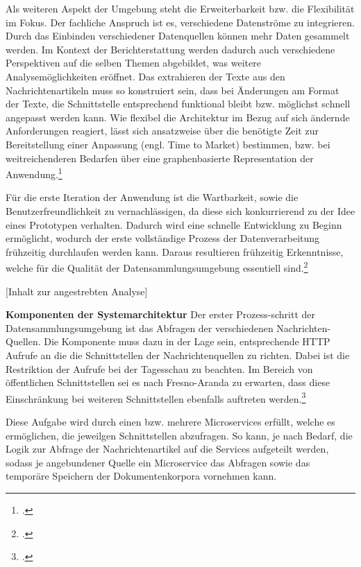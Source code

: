 Als weiteren Aspekt der Umgebung steht die Erweiterbarkeit bzw. die Flexibilität im Fokus. Der fachliche Anspruch ist es, verschiedene Datenströme zu integrieren. Durch das Einbinden verschiedener Datenquellen können mehr Daten gesammelt werden. Im Kontext der Berichterstattung werden dadurch auch verschiedene Perspektiven auf die selben Themen abgebildet, was weitere Analysemöglichkeiten eröffnet. Das extrahieren der Texte aus den Nachrichtenartikeln muss so konstruiert sein, dass  bei Änderungen am Format der Texte, die Schnittstelle entsprechend funktional bleibt bzw. möglichst schnell angepasst werden kann. Wie flexibel die Architektur im Bezug auf sich ändernde Anforderungen reagiert, lässt sich ansatzweise über die benötigte Zeit zur Bereitstellung einer Anpassung (engl. Time to Market) bestimmen, bzw. bei weitreichenderen Bedarfen über eine graphenbasierte Representation der Anwendung.\footcite[Vgl.][]{Broniatowski.Measuring.2016}{}{}

Für die erste Iteration der Anwendung ist die Wartbarkeit, sowie die Benutzerfreundlichkeit zu vernachlässigen, da diese sich konkurrierend zu der Idee eines Prototypen verhalten. Dadurch wird eine schnelle Entwicklung zu Beginn ermöglicht, wodurch der erste vollständige Prozess der Datenverarbeitung frühzeitig durchlaufen werden kann. Daraus resultieren frühzeitig Erkenntnisse, welche für die Qualität der Datensammlungsumgebung essentiell sind.\footcite[Vgl.][]{Strang.Mining.2023}{}{}

[Inhalt zur angestrebten Analyse]

\textbf{Komponenten der Systemarchitektur}
Der erster Prozess-schritt der Datensammlungsumgebung ist das Abfragen der verschiedenen Nachrichten-Quellen. Die Komponente muss dazu in der Lage sein, entsprechende HTTP Aufrufe an die die Schnittstellen der Nachrichtenquellen zu richten. Dabei ist die Restriktion der Aufrufe bei der Tagesschau zu beachten. Im Bereich von öffentlichen Schnittstellen sei es nach Fresno-Aranda zu erwarten, dass diese Einschränkung bei weiteren Schnittstellen ebenfalls auftreten werden.\footcite[Vgl.][]{Fresno-Aranda.Automated.2022}{}{}

Diese Aufgabe wird durch einen  bzw. mehrere  Microservices erfüllt, welche es ermöglichen, die jeweilgen Schnittstellen abzufragen.  So kann, je nach Bedarf, die Logik zur Abfrage der Nachrichtenartikel auf die Services aufgeteilt werden, sodass je angebundener Quelle ein Microservice das Abfragen sowie das temporäre Speichern der Dokumentenkorpora vornehmen kann. 

